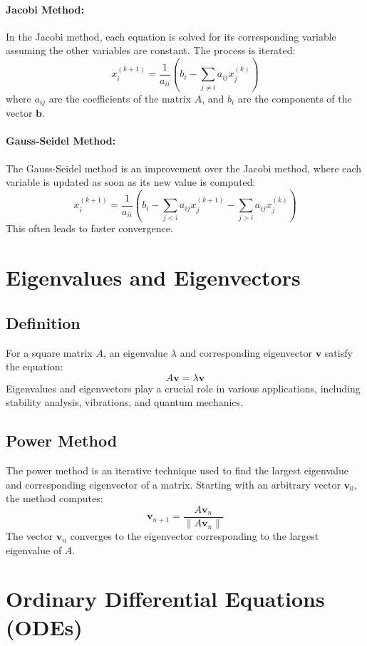 \documentclass[12pt]{article}
\begin{document}
\paragraph{Jacobi Method:}
In the Jacobi method, each equation is solved for its corresponding variable assuming the other variables are constant. The process is iterated:
\[
x_i^{(k+1)} = \frac{1}{a_{ii}} \left(b_i - \sum_{j \neq i} a_{ij} x_j^{(k)} \right)
\]
where \( a_{ij} \) are the coefficients of the matrix \( A \), and \( b_i \) are the components of the vector \( \mathbf{b} \).

\paragraph{Gauss-Seidel Method:}
The Gauss-Seidel method is an improvement over the Jacobi method, where each variable is updated as soon as its new value is computed:
\[
x_i^{(k+1)} = \frac{1}{a_{ii}} \left(b_i - \sum_{j < i} a_{ij} x_j^{(k+1)} - \sum_{j > i} a_{ij} x_j^{(k)} \right)
\]
This often leads to faster convergence.

\section{Eigenvalues and Eigenvectors}
\subsection{Definition}
For a square matrix \( A \), an eigenvalue \( \lambda \) and corresponding eigenvector \( \mathbf{v} \) satisfy the equation:
\[
A\mathbf{v} = \lambda\mathbf{v}
\]
Eigenvalues and eigenvectors play a crucial role in various applications, including stability analysis, vibrations, and quantum mechanics.

\subsection{Power Method}
The power method is an iterative technique used to find the largest eigenvalue and corresponding eigenvector of a matrix. Starting with an arbitrary vector \( \mathbf{v}_0 \), the method computes:
\[
\mathbf{v}_{n+1} = \frac{A\mathbf{v}_n}{\|A\mathbf{v}_n\|}
\]
The vector \( \mathbf{v}_n \) converges to the eigenvector corresponding to the largest eigenvalue of \( A \).

\section{Ordinary Differential Equations (ODEs)}
\end{document}
